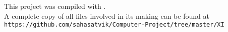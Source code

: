 
\thispagestyle{empty}\addtocounter{page}{-1}
\hspace{0pt}
\vfill
\begin{center}
This project was compiled with \XeLaTeX .\\
\vspace{5mm}
A complete copy of all files involved in its making can be found at
{\tt https://github.com/sahasatvik/Computer-Project/tree/master/XI}
\end{center}
\vfill
\hspace{0pt}